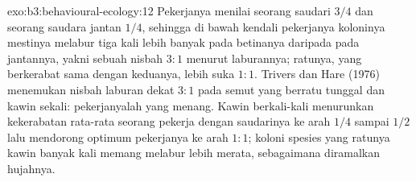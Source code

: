 \begin{solution}{exo:b3:behavioural-ecology:12}
Pekerjanya menilai seorang saudari $3/4$ dan seorang saudara jantan $1/4$, sehingga di bawah kendali
pekerjanya koloninya mestinya melabur tiga kali lebih banyak pada betinanya daripada pada
jantannya, yakni sebuah nisbah $3{:}1$ menurut laburannya; ratunya, yang berkerabat sama dengan keduanya,
lebih suka $1{:}1$. Trivers dan Hare (1976) menemukan nisbah laburan dekat
$3{:}1$ pada semut yang berratu tunggal dan kawin sekali: pekerjanyalah yang menang.
Kawin berkali-kali menurunkan kekerabatan rata-rata seorang pekerja dengan saudarinya
ke arah $1/4$ sampai $1/2$ lalu mendorong optimum pekerjanya ke arah $1{:}1$;
koloni spesies yang ratunya kawin banyak kali memang melabur lebih merata, sebagaimana
diramalkan hujahnya.
\end{solution}

